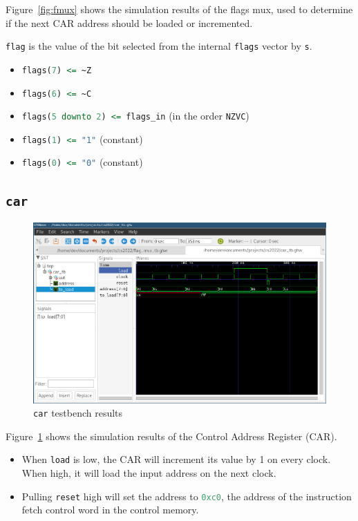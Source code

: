 \documentclass[a4paper]{article}
\numberwithin{figure}{section}
\numberwithin{table}{section}
\newcommand{\mi}{\mintinline}
\begin{document}
Figure~\ref{fig:fmux} shows the simulation results of the flags mux, used to determine if the next CAR address 
should be loaded or incremented.

\mi{c}{flag} is the value of the bit selected from the internal \mi{c}{flags} vector by \mi{c}{s}.
\begin{itemize}
	\item \mi{vhdl}{flags(7) <= ~Z}
	\item \mi{vhdl}{flags(6) <= ~C}
	\item \mi{vhdl}{flags(5 downto 2) <= flags_in} (in the order \mi{c}{NZVC})
	\item \mi{vhdl}{flags(1) <= "1"} (constant)
	\item \mi{vhdl}{flags(0) <= "0"} (constant)
\end{itemize}

\newpage
\subsection{\mi{c}{car}}
\begin{figure}[h!]
	\centering
	\includegraphics[width=\textwidth]{car_tb}
	\caption{\mi{c}{car} testbench results}
	\label{fig:car}
\end{figure}

Figure~\ref{fig:car} shows the simulation results of the Control Address Register (CAR).

\begin{itemize}
	\item When \mi{c}{load} is low, the CAR will increment its value by 1 on every clock.
		When high, it will load the input address on the next clock.
	\item Pulling \mi{c}{reset} high will set the address to \mi{c}{0xc0}, the address of the instruction fetch
		control word in the control memory.
\end{itemize}
\end{document}
